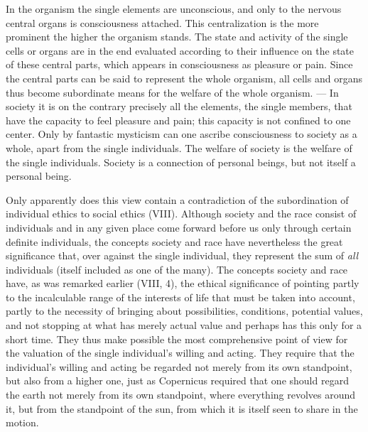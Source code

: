 \documentclass[12pt,a4paper,openany]{book}
\newcommand{\opage}[1]{\marginnote{\footnotesize\textit{[#1]}}}
\begin{document}
In the organism the single elements are unconscious, and only to the nervous central organs is consciousness attached.
This centralization is the more prominent the higher the organism stands. The state and activity of the single cells or
organs are in the end evaluated according to their influence on the state of these central parts, which appears in
consciousness as pleasure or pain. Since the central parts can be said to represent the whole organism, all cells and
organs thus become subordinate means for the welfare of the whole organism. --- In society it is
\opage{273}on the contrary precisely all the elements, the single members, that have the capacity to feel pleasure and
pain; this capacity is not confined to one center. Only by fantastic mysticism can one ascribe consciousness to society
as a whole, apart from the single individuals. The welfare of society is the welfare of the single individuals. Society
is a connection of personal beings, but not itself a personal being.

Only apparently does this view contain a contradiction of the subordination of individual ethics to social ethics
(VIII). Although society and the race consist of individuals and in any given place come forward before us only through
certain definite individuals, the concepts society and race have nevertheless the great significance that, over against
the single individual, they represent the sum of \textit{all} individuals (itself included as one of the many). The
concepts society and race have, as was remarked earlier (VIII, 4), the ethical significance of pointing partly to the
incalculable range of the interests of life that must be taken into account, partly to the necessity of bringing about
possibilities, conditions, potential values, and not stopping at what has merely actual value and perhaps has this only
for a short time. They thus make possible the most comprehensive point of view for the valuation of the single
individual's willing and acting. They require that the individual's willing and acting be regarded not merely from its
own standpoint, but also from a higher one, just as Copernicus required that one should regard the earth not merely from
its own standpoint, where everything revolves around it, but from the standpoint of the sun, from which it is itself
seen to share in the motion.
\end{document}
